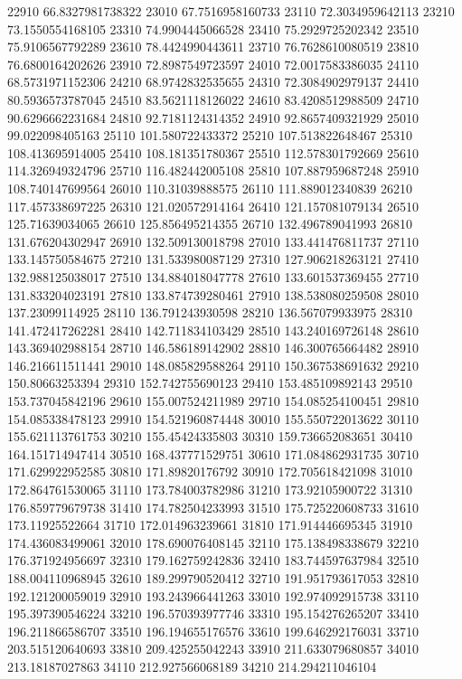 {22910 66.8327981738322
23010 67.7516958160733
23110 72.3034959642113
23210 73.1550554168105
23310 74.9904445066528
23410 75.2929725202342
23510 75.9106567792289
23610 78.4424990443611
23710 76.7628610080519
23810 76.6800164202626
23910 72.8987549723597
24010 72.0017583386035
24110 68.5731971152306
24210 68.9742832535655
24310 72.3084902979137
24410 80.5936573787045
24510 83.5621118126022
24610 83.4208512988509
24710 90.6296662231684
24810 92.7181124314352
24910 92.8657409321929
25010 99.022098405163
25110 101.580722433372
25210 107.513822648467
25310 108.413695914005
25410 108.181351780367
25510 112.578301792669
25610 114.326949324796
25710 116.482442005108
25810 107.887959687248
25910 108.740147699564
26010 110.31039888575
26110 111.889012340839
26210 117.457338697225
26310 121.020572914164
26410 121.157081079134
26510 125.71639034065
26610 125.856495214355
26710 132.496789041993
26810 131.676204302947
26910 132.509130018798
27010 133.441476811737
27110 133.145750584675
27210 131.533980087129
27310 127.906218263121
27410 132.988125038017
27510 134.884018047778
27610 133.601537369455
27710 131.833204023191
27810 133.874739280461
27910 138.538080259508
28010 137.23099114925
28110 136.791243930598
28210 136.567079933975
28310 141.472417262281
28410 142.711834103429
28510 143.240169726148
28610 143.369402988154
28710 146.586189142902
28810 146.300765664482
28910 146.216611511441
29010 148.085829588264
29110 150.367538691632
29210 150.80663253394
29310 152.742755690123
29410 153.485109892143
29510 153.737045842196
29610 155.007524211989
29710 154.085254100451
29810 154.085338478123
29910 154.521960874448
30010 155.550722013622
30110 155.621113761753
30210 155.45424335803
30310 159.736652083651
30410 164.151714947414
30510 168.437771529751
30610 171.084862931735
30710 171.629922952585
30810 171.89820176792
30910 172.705618421098
31010 172.864761530065
31110 173.784003782986
31210 173.92105900722
31310 176.859779679738
31410 174.782504233993
31510 175.725220608733
31610 173.11925522664
31710 172.014963239661
31810 171.914446695345
31910 174.436083499061
32010 178.690076408145
32110 175.138498338679
32210 176.371924956697
32310 179.162759242836
32410 183.744597637984
32510 188.004110968945
32610 189.299790520412
32710 191.951793617053
32810 192.121200059019
32910 193.243966441263
33010 192.974092915738
33110 195.397390546224
33210 196.570393977746
33310 195.154276265207
33410 196.211866586707
33510 196.194655176576
33610 199.646292176031
33710 203.515120640693
33810 209.425255042243
33910 211.633079680857
34010 213.18187027863
34110 212.927566068189
34210 214.294211046104
}
